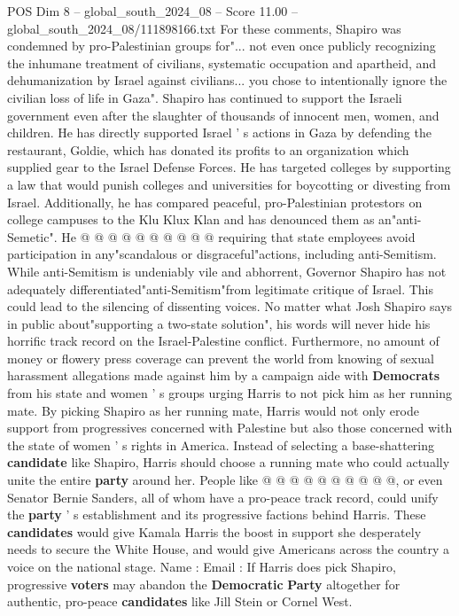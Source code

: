 \begin{textsample}{POS Dim 8 – global\_south\_2024\_08 – Score 11.00 – global\_south\_2024\_08/111898166.txt}
For these comments, Shapiro was condemned by pro-Palestinian groups for"... not even once publicly recognizing the inhumane treatment of civilians, systematic occupation and apartheid, and dehumanization by Israel against civilians... you chose to intentionally ignore the civilian loss of life in Gaza".
Shapiro has continued to support the Israeli government even after the slaughter of thousands of innocent men, women, and children.
He has directly supported Israel ' s actions in Gaza by defending the restaurant, Goldie, which has donated its profits to an organization which supplied gear to the Israel Defense Forces.
He has targeted colleges by supporting a law that would punish colleges and universities for boycotting or divesting from Israel.
Additionally, he has compared peaceful, pro-Palestinian protestors on college campuses to the Klu Klux Klan and has denounced them as an"anti-Semetic".
He @ @ @ @ @ @ @ @ @ @ requiring that state employees avoid participation in any"scandalous or disgraceful"actions, including anti-Semitism.
While anti-Semitism is undeniably vile and abhorrent, Governor Shapiro has not adequately differentiated"anti-Semitism"from legitimate critique of Israel.
This could lead to the silencing of dissenting voices.
No matter what Josh Shapiro says in public about"supporting a two-state solution", his words will never hide his horrific track record on the Israel-Palestine conflict.
Furthermore, no amount of money or flowery press coverage can prevent the world from knowing of sexual harassment allegations made against him by a campaign aide with \textbf{Democrats} from his state and women ' s groups urging Harris to not pick him as her running mate.
By picking Shapiro as her running mate, Harris would not only erode support from progressives concerned with Palestine but also those concerned with the state of women ' s rights in America.
Instead of selecting a base-shattering \textbf{candidate} like Shapiro, Harris should choose a running mate who could actually unite the entire \textbf{party} around her.
People like @ @ @ @ @ @ @ @ @ @, or even Senator Bernie Sanders, all of whom have a pro-peace track record, could unify the \textbf{party} ' s establishment and its progressive factions behind Harris.
These \textbf{candidates} would give Kamala Harris the boost in support she desperately needs to secure the White House, and would give Americans across the country a voice on the national stage.
Name : Email : If Harris does pick Shapiro, progressive \textbf{voters} may abandon the \textbf{Democratic} \textbf{Party} altogether for authentic, pro-peace \textbf{candidates} like Jill Stein or Cornel West.

\end{textsample}
